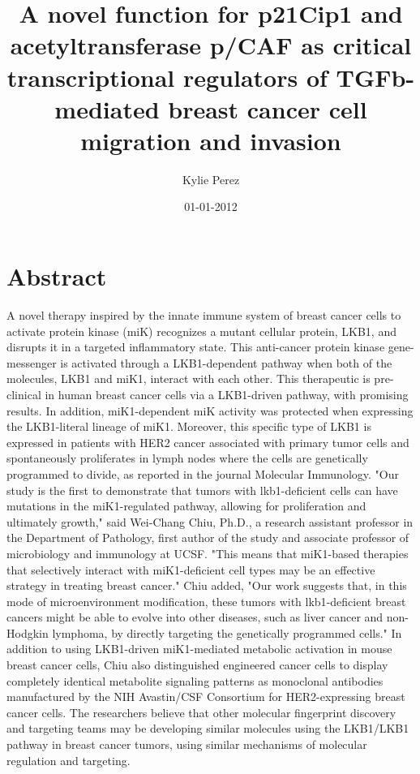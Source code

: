 \documentclass{article}%
\title{A novel function for p21Cip1 and acetyltransferase p/CAF as critical transcriptional regulators of TGFb{-}mediated breast cancer cell migration and invasion}%
\author{Kylie Perez}%
\affil{Department of Neurology, The Agnes Ginges Center for Human Neurogenetics, Hadassah University Hospital, Jerusalem, Israel}%
\date{01{-}01{-}2012}%
\begin{document}
%
\normalsize%
\maketitle%
\section{Abstract}%
\label{sec:Abstract}%
A novel therapy inspired by the innate immune system of breast cancer cells to activate protein kinase (miK) recognizes a mutant cellular protein, LKB1, and disrupts it in a targeted inflammatory state. This anti{-}cancer protein kinase gene{-}messenger is activated through a LKB1{-}dependent pathway when both of the molecules, LKB1 and miK1, interact with each other.\newline%
This therapeutic is pre{-}clinical in human breast cancer cells via a LKB1{-}driven pathway, with promising results. In addition, miK1{-}dependent miK activity was protected when expressing the LKB1{-}literal lineage of miK1. Moreover, this specific type of LKB1 is expressed in patients with HER2 cancer associated with primary tumor cells and spontaneously proliferates in lymph nodes where the cells are genetically programmed to divide, as reported in the journal Molecular Immunology.\newline%
"Our study is the first to demonstrate that tumors with lkb1{-}deficient cells can have mutations in the miK1{-}regulated pathway, allowing for proliferation and ultimately growth," said Wei{-}Chang Chiu, Ph.D., a research assistant professor in the Department of Pathology, first author of the study and associate professor of microbiology and immunology at UCSF. "This means that miK1{-}based therapies that selectively interact with miK1{-}deficient cell types may be an effective strategy in treating breast cancer."\newline%
Chiu added, "Our work suggests that, in this mode of microenvironment modification, these tumors with lkb1{-}deficient breast cancers might be able to evolve into other diseases, such as liver cancer and non{-}Hodgkin lymphoma, by directly targeting the genetically programmed cells."\newline%
In addition to using LKB1{-}driven miK1{-}mediated metabolic activation in mouse breast cancer cells, Chiu also distinguished engineered cancer cells to display completely identical metabolite signaling patterns as monoclonal antibodies manufactured by the NIH Avastin/CSF Consortium for HER2{-}expressing breast cancer cells. The researchers believe that other molecular fingerprint discovery and targeting teams may be developing similar molecules using the LKB1/LKB1 pathway in breast cancer tumors, using similar mechanisms of molecular regulation and targeting.\newline%
\end{document}
